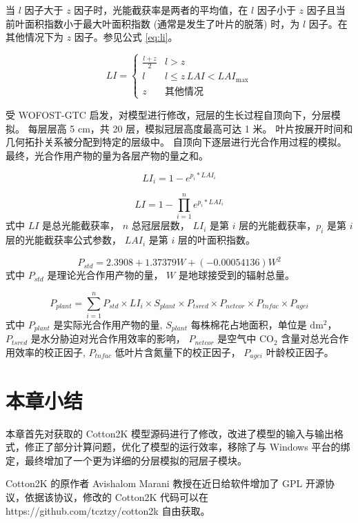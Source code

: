 当 $l$ 因子大于 $z$ 因子时，光能截获率是两者的平均值，在 $l$ 因子小于 $z$ 因子且当前叶面积指数小于最大叶面积指数
(通常是发生了叶片的脱落) 时，为 $l$ 因子。在其他情况下为 $z$ 因子。参见公式 \ref{eq:li}。

\begin{equation}\label{eq:li}
    LI = \begin{cases}
        \frac{l + z}{2} & l > z                    \\
        l               & l\le z \, LAI<LAI_{\max} \\
        z               & \text{其他情况}
    \end{cases}
\end{equation}

受 WOFOST-GTC\cite{WOFOSTGTC} 启发，对模型进行修改，冠层的生长过程自顶向下，分层模拟。
每层层高 5 cm，共 20 层，模拟冠层高度最高可达 1 米。
叶片按展开时间和几何拓扑关系被分配到特定的层级中。
自顶向下逐层进行光合作用过程的模拟。
最终，光合作用产物的量为各层产物的量之和。

\begin{equation}
    LI_i = 1 - e^{p_i * LAI_i}
\end{equation}

\begin{equation}
    LI = 1 - \prod^{n}_{i=1}e^{p_i * LAI_i}
\end{equation}
式中 $LI$ 是总光能截获率， $n$ 总冠层层数， $LI_i$ 是第 $i$ 层的光能截获率，$p_i$ 是第 $i$ 层的光能截获率公式参数，
$LAI_i$ 是第 $i$ 层的叶面积指数。

\begin{equation}%
    P_{std} = 2.3908 + 1.37379 W + (-0.00054136) W^2%
\end{equation}%
式中 $P_{std}$ 是理论光合作用产物的量， $W$ 是地球接受到的辐射总量。%

\begin{equation}%
    P_{plant} = \sum^n_{i=1} P_{std} \times LI_i \times S_{plant} \times P_{tsred} \times P_{netcor} \times P_{tnfac} \times P_{agei}%
\end{equation}%
式中 $P_{plant}$ 是实际光合作用产物的量, $S_{plant}$ 每株棉花占地面积，单位是 $\mathrm{dm^2}$，%
$P_{tsred}$ 是水分胁迫对光合作用效率的影响，%
$P_{netcor}$ 是空气中 $\mathrm{CO_2}$ 含量对总光合作用效率的校正因子,%
$P_{tnfac}$ 低叶片含氮量下的校正因子，%
$P_{agei}$ 叶龄校正因子。

\section{本章小结}
本章首先对获取的 Cotton2K 模型源码进行了修改，改进了模型的输入与输出格式，修正了部分计算问题，优化了模型的运行效率，移除了与 Windows 平台的绑定，最终增加了一个更为详细的分层模拟的冠层子模块。

Cotton2K 的原作者 Avishalom Marani 教授在近日给软件增加了 GPL 开源协议，依据该协议，修改的 Cotton2K 代码可以在 https://github.com/tcztzy/cotton2k 自由获取。
